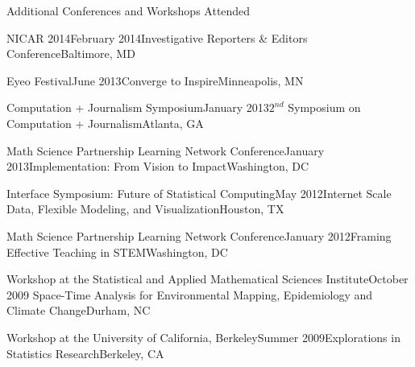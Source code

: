 \documentclass{resume} %
\begin{document}
\begin{rSection}{Additional Conferences and Workshops Attended}
\begin{sSubsection}{NICAR 2014}{}{February 2014}{Investigative Reporters \& Editors Conference}{Baltimore, MD}
\end{sSubsection}

\begin{sSubsection}{Eyeo Festival}{}{June 2013}{Converge to Inspire}{Minneapolis, MN}
\end{sSubsection}

\begin{sSubsection}{Computation + Journalism Symposium}{}{January 2013}{$2^{nd}$ Symposium on Computation + Journalism}{Atlanta, GA}
\end{sSubsection}

\begin{sSubsection}{Math Science Partnership Learning Network Conference}{}{January 2013}{Implementation: From Vision to Impact}{Washington, DC}
\end{sSubsection}

\begin{sSubsection}{Interface Symposium: Future of Statistical Computing}{}{May 2012}{Internet Scale Data, Flexible Modeling, and Visualization}{Houston, TX}
\end{sSubsection}

\begin{sSubsection}{Math Science Partnership Learning Network Conference}{}{January 2012}{Framing Effective Teaching in STEM}{Washington, DC}
\end{sSubsection}

\begin{sSubsection}{Workshop at the Statistical and Applied Mathematical Sciences Institute}{}{October 2009}{ Space-Time Analysis for Environmental Mapping, Epidemiology and Climate Change}{Durham, NC}
\end{sSubsection}

\begin{sSubsection}{Workshop at the University of California, Berkeley}{}{Summer 2009}{Explorations in Statistics Research}{Berkeley, CA}
\end{sSubsection}
\end{rSection}
\end{document}
